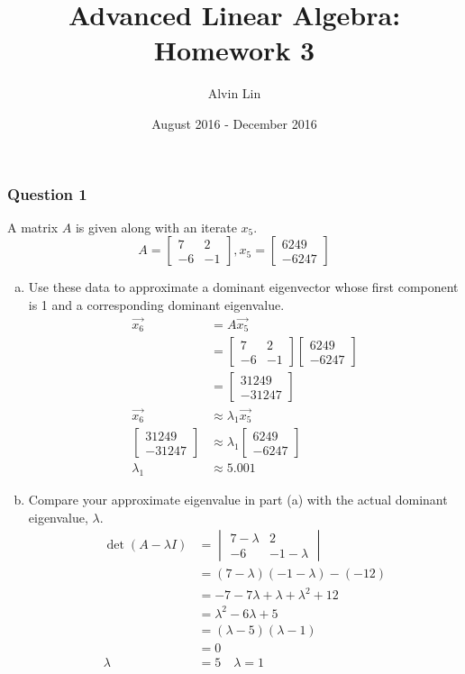 \documentclass{math}
\title{Advanced Linear Algebra: Homework 3}
\author{Alvin Lin}
\date{August 2016 - December 2016}
\begin{document}
\maketitle

\subsubsection*{Question 1}
A matrix \( A \) is given along with an iterate \( x_5 \).
\[ A = \begin{bmatrix}
  7 & 2 \\
  -6 & -1
\end{bmatrix}, x_5 = \begin{bmatrix}6249 \\ -6247\end{bmatrix} \]
\begin{enumerate}[(a)]
  \item Use these data to approximate a dominant eigenvector whose first
    component is 1 and a corresponding dominant eigenvalue.
  \begin{align*}
    \vec{x_6} &= A\vec{x_5} \\
    &= \begin{bmatrix}7 & 2 \\ -6 & -1\end{bmatrix}\begin{bmatrix}
      6249 \\ -6247
    \end{bmatrix} \\
    &= \begin{bmatrix}31249 \\ -31247\end{bmatrix} \\
    \vec{x_6} &\approx \lambda_1\vec{x_5} \\
    \begin{bmatrix}31249 \\ -31247\end{bmatrix} &\approx \lambda_1
      \begin{bmatrix}6249 \\ -6247\end{bmatrix} \\
    \lambda_1 &\approx 5.001
  \end{align*}
  \item Compare your approximate eigenvalue in part (a) with the actual
    dominant eigenvalue, \( \lambda \).
  \begin{align*}
    \det(A-\lambda I) &= \begin{vmatrix}
      7-\lambda & 2 \\ -6 & -1-\lambda
    \end{vmatrix} \\
    &= (7-\lambda)(-1-\lambda)-(-12) \\
    &= -7-7\lambda+\lambda+\lambda^2+12 \\
    &= \lambda^2-6\lambda+5 \\
    &= (\lambda-5)(\lambda-1) \\
    &= 0 \\
    \lambda &= 5 \quad \lambda = 1
  \end{align*}
\end{enumerate}
\end{document}
